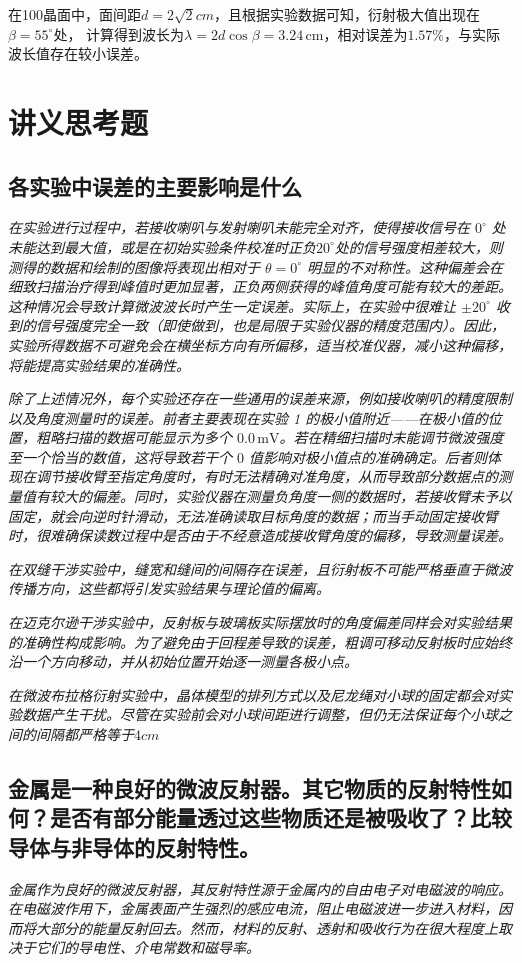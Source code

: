 \documentclass[UTF-8,twoside,cs4size]{ctexart}
\begin{document}
在100晶面中，面间距$d=2\sqrt{2}cm$，且根据实验数据可知，衍射极大值出现在$ \beta=55^\circ $处，
计算得到波长为$ \lambda=2d\cos\beta=3.24\,\mathrm{cm} $，相对误差为$ 1.57\% $，与实际波长值存在较小误差。

\section{讲义思考题}
\subsection{各实验中误差的主要影响是什么}
\textit{在实验进行过程中，若接收喇叭与发射喇叭未能完全对齐，使得接收信号在 $0^\circ$ 处未能达到最大值，或是在初始实验条件校准时正负$20^\circ$处的信号强度相差较大，则测得的数据和绘制的图像将表现出相对于 $\theta=0^\circ$ 明显的不对称性。这种偏差会在细致扫描治疗得到峰值时更加显著，正负两侧获得的峰值角度可能有较大的差距。这种情况会导致计算微波波长时产生一定误差。实际上，在实验中很难让 $\pm 20^\circ$ 收到的信号强度完全一致（即使做到，也是局限于实验仪器的精度范围内）。因此，实验所得数据不可避免会在横坐标方向有所偏移，适当校准仪器，减小这种偏移，将能提高实验结果的准确性。}

\textit{除了上述情况外，每个实验还存在一些通用的误差来源，例如接收喇叭的精度限制以及角度测量时的误差。前者主要表现在实验 1 的极小值附近——在极小值的位置，粗略扫描的数据可能显示为多个 $0.0\, \mathrm{mV}$。若在精细扫描时未能调节微波强度至一个恰当的数值，这将导致若干个 $0$ 值影响对极小值点的准确确定。后者则体现在调节接收臂至指定角度时，有时无法精确对准角度，从而导致部分数据点的测量值有较大的偏差。同时，实验仪器在测量负角度一侧的数据时，若接收臂未予以固定，就会向逆时针滑动，无法准确读取目标角度的数据；而当手动固定接收臂时，很难确保读数过程中是否由于不经意造成接收臂角度的偏移，导致测量误差。}

\textit{在双缝干涉实验中，缝宽和缝间的间隔存在误差，且衍射板不可能严格垂直于微波传播方向，这些都将引发实验结果与理论值的偏离。}

\textit{在迈克尔逊干涉实验中，反射板与玻璃板实际摆放时的角度偏差同样会对实验结果的准确性构成影响。为了避免由于回程差导致的误差，粗调可移动反射板时应始终沿一个方向移动，并从初始位置开始逐一测量各极小点。}

\textit{在微波布拉格衍射实验中，晶体模型的排列方式以及尼龙绳对小球的固定都会对实验数据产生干扰。尽管在实验前会对小球间距进行调整，但仍无法保证每个小球之间的间隔都严格等于$4cm$}

\subsection{金属是一种良好的微波反射器。其它物质的反射特性如何？是否有部分能量透过这些物质还是被吸收了？比较导体与非导体的反射特性。}
\textit{金属作为良好的微波反射器，其反射特性源于金属内的自由电子对电磁波的响应。在电磁波作用下，金属表面产生强烈的感应电流，阻止电磁波进一步进入材料，因而将大部分的能量反射回去。然而，材料的反射、透射和吸收行为在很大程度上取决于它们的导电性、介电常数和磁导率。}
\end{document}
